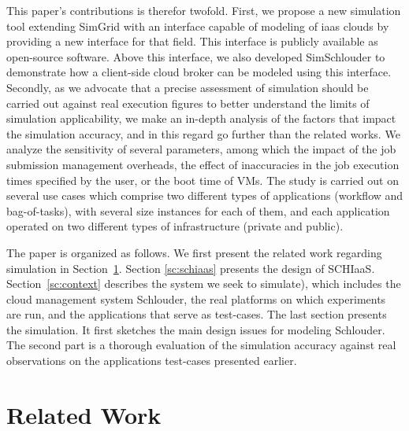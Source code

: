 This  paper's  contributions  is  therefor  twofold. First,  we  propose  a  new
simulation  tool extending  SimGrid with  an  interface capable  of modeling  of
\ac{iaas} clouds by providing a new  interface for that field. This interface is
publicly  available as  open-source  software.  Above  this  interface, we  also
developed  SimSchlouder to  demonstrate how  a client-side  cloud broker  can be
modeled using this interface.
%
Secondly,  as we  advocate that  a precise  assessment of  simulation should  be
carried out  against real execution figures  to better understand the  limits of
simulation  applicability, we  make an  in-depth  analysis of  the factors  that
impact the simulation  accuracy, and in this regard go  further than the related
works. We analyze the sensitivity of  several parameters, among which the impact
of the  job submission management overheads,  the effect of inaccuracies  in the
job execution times specified  by the user, or the boot time  of VMs.  The study
is  carried out  on several  use  cases which  comprise two  different types  of
applications (workflow and  bag-of-tasks), with several size  instances for each
of them, and each application operated  on two different types of infrastructure
(private and public).


The paper is  organized as follows. We first present  the related work regarding
simulation in  Section~\ref{sc:relwork}.  Section \ref{sc:schiaas}  presents the
design of  SCHIaaS.  Section~\ref{sc:context}  describes the  system we  seek to
simulate),  which  includes the  cloud  management  system Schlouder,  the  real
platforms  on which  experiments are  run, and  the applications  that serve  as
test-cases. The last section presents the simulation. It first sketches the main
design issues for  modeling Schlouder. The second part is  a thorough evaluation
of  the  simulation  accuracy  against real  observations  on  the  applications
test-cases  presented  earlier.


\section{Related Work}
\label{sc:relwork}

